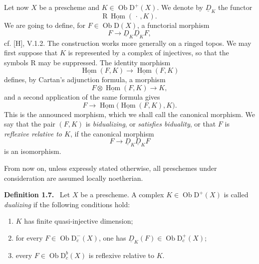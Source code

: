 \documentclass[12pt]{article}
\newcommand{\Hom}{\operatorname{Hom}}
\newcommand{\ob}{\operatorname{Ob}}
\newcommand{\D}{\mathrm D}
\newcommand{\R}{\mathrm R}
\newenvironment{statement}[1]{\par\medskip\noindent\textbf{#1.}\ }{\par\medskip}
\begin{document}
Let now $X$ be a prescheme and $K\in\ob\D^+(X)$. We denote by $\underline D_K$ the functor
\[
   \R\,\underline{\Hom}(\,\cdot\,,K).
\]
We are going to define, for $F\in\ob\D(X)$, a functorial morphism
\[
   F\longrightarrow \underline D_K\underline D_KF,
\]
cf. [H], V.1.2. The construction works more generally on a ringed topos. We may first suppose that $K$ is represented by a complex of injectives, so that the symbols $\R$ may be suppressed. The identity morphism
\[
   \underline{\Hom}(F,K)\longrightarrow\underline{\Hom}(F,K)
\]
defines, by Cartan's adjunction formula, a morphism
\[
   F\otimes\underline{\Hom}(F,K)\longrightarrow K,
\]
and a second application of the same formula gives
\[
   F\longrightarrow\underline{\Hom}\bigl(\underline{\Hom}(F,K),K\bigr).
\]
This is the announced morphism, which we shall call the canonical morphism. We say that the pair $(F,K)$ is \emph{bidualizing}, or \emph{satisfies biduality}, or that $F$ is \emph{reflexive relative to $K$}, if the canonical morphism
\[
   F\longrightarrow \underline D_K\underline D_KF
\]
is an isomorphism.

From now on, unless expressly stated otherwise, all preschemes under consideration are assumed locally noetherian.

\begin{statement}{Definition 1.7}
Let $X$ be a prescheme. A complex $K\in\ob\D^+(X)$ is called \emph{dualizing} if the following conditions hold:
\begin{enumerate}[label=(\roman*)]
\item $K$ has finite quasi-injective dimension;
\item for every $F\in\ob\D_c^-(X)$, one has $\underline D_K(F)\in\ob\D_c^+(X)$;
\item every $F\in\ob\D_c^b(X)$ is reflexive relative to $K$.
\end{enumerate}
\end{statement}
\end{document}
